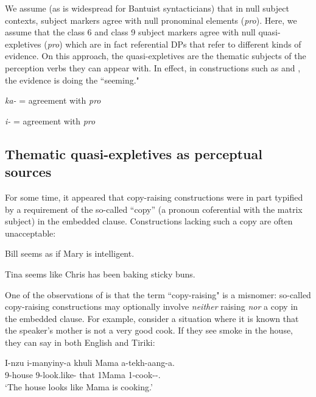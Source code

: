 \documentclass[output=paper,colorlinks,citecolor=brown
]{langscibook}
\begin{document}
We assume (as is widespread for Bantuist syntacticians) that in null subject contexts, subject markers agree with null pronominal elements (\textit{pro}). Here, we assume that the class 6 and class 9 subject markers agree with null quasi-expletives (\textit{pro}) which are in fact referential DPs that refer to different kinds of evidence. On this approach, the quasi-expletives are the thematic subjects of the perception verbs they can appear with. In effect, in constructions such as  and , the evidence is doing the ``seeming."
\ea \label{ex:johnson:QuasiExpletiveContent}
\begin{xlist}

\ex \textit{ka-} = agreement with \textit{pro}

\ex \textit{i-}   = agreement with \textit{pro}


\end{xlist}
\z 

\subsection{Thematic quasi-expletives as perceptual sources}

For some time, it appeared that copy-raising constructions were in part typified by a requirement of the so-called ``copy'' (a pronoun coferential with the matrix subject) in the embedded clause. Constructions lacking such a copy are often unacceptable:

\ea \label{ex:johnson:CrLackOfCopyPragmaticProblem}
\ea *Bill seems as if Mary is intelligent.

\citep[(16b)]{Lappin1984Raising}
\ex *Tina seems like Chris has been baking sticky buns.

\citep[(14a)]{AsudehToivonen2012CopyRaising} 
\z \z

One of the observations of \citet{Landau:2009:CopyRaising, Landau:2011:CopyRaising} is that the term ``copy-raising" is a misnomer: so-called copy-raising constructions may optionally involve \textit{neither} raising \textit{nor} a copy in the embedded clause. For example, consider a situation where it is known that the speaker's mother is not a very good cook. If they see smoke in the house, they can say in both English and Tiriki: 

\ea \label{ex:johnson:HouseLooksMamaCooking}
\gll I-nzu i-manyiny-a khuli Mama a-tekh-aang-a.\\
9-house 9\Sm-look.like-\Fv{} that 1Mama 1\Sm-cook-\Hab-\Fv{}.\\
\glt `The house looks like Mama is cooking.'
\z
\end{document}
